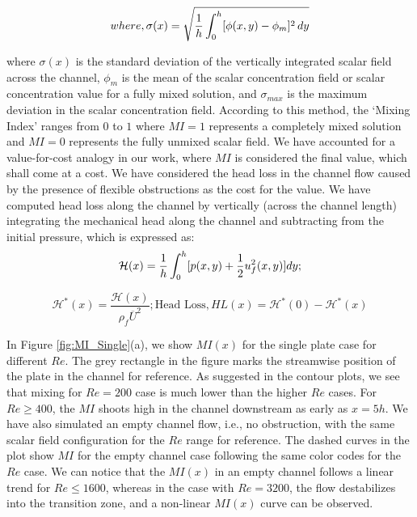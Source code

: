 \documentclass[reprint,a4paper,fleqn]{cas-dc} %
\begin{document}
		\begin{equation}
		where, \sigma(x)=\sqrt{{1\over h} \int_{0}^{h} [\phi(x,y)-\phi_m]^2 \,dy}
		\end{equation}
		
		where $\sigma(x)$ is the standard deviation of the vertically integrated scalar field across the channel, $\phi_m$ is the mean of the scalar concentration field or scalar concentration value for a fully mixed solution, and $\sigma_{max}$ is the maximum deviation in the scalar concentration field. According to this method, the `Mixing Index' ranges from $0$ to $1$ where $MI=1$ represents a completely mixed solution and $MI=0$ represents the fully unmixed scalar field. We have accounted for a value-for-cost analogy in our work, where $MI$ is considered the final value, which shall come at a cost. We have considered the head loss in the channel flow caused by the presence of flexible obstructions as the cost for the value. We have computed head loss along the channel by vertically (across the channel length) integrating the mechanical head along the channel and subtracting from the initial pressure, which is expressed as:
		\begin{equation}
			\mathcal{H}(x)=\frac{1}{h}\int_{0}^{h}[p(x,y)+{1\over2}  u_f^2(x,y)]dy;  
		\end{equation}
		
		\begin{equation}
			\mathcal{H}^*(x)=\frac{\mathcal{H}(x)}{\rho_f \overline{U}^2}; \text{Head Loss}, HL(x) = \mathcal{H}^*(0)-\mathcal{H}^*(x)
		\end{equation}
		
		In Figure \ref{fig:MI_Single}(a), we show $MI(x)$ for the single plate case for different $Re$. The grey rectangle in the figure marks the streamwise position of the plate in the channel for reference. As suggested in the contour plots, we see that mixing for $Re=200$ case is much lower than the higher $Re$ cases. For $Re\geq400$, the $MI$ shoots high in the channel downstream as early as $x=5h$. We have also simulated an empty channel flow, i.e., no obstruction, with the same scalar field configuration for the $Re$ range for reference. The dashed curves in the plot show $MI$ for the empty channel case following the same color codes for the $Re$ case. We can notice that the $MI(x)$ in an empty channel follows a linear trend for $Re\leq1600$, whereas in the case with $Re=3200$, the flow destabilizes into the transition zone, and a non-linear $MI(x)$ curve can be observed.
		
\end{document}
